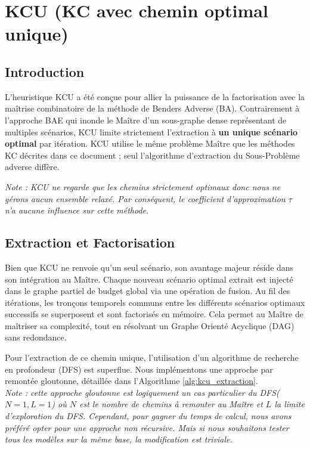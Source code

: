 \documentclass[11pt,a4paper]{article}
\begin{document}
\section{KCU (KC avec chemin optimal unique)}
\label{kcu}

\subsection{Introduction}

L'heuristique KCU a été conçue pour allier la puissance de la factorisation avec la maîtrise combinatoire de la méthode de Benders Adverse (BA). Contrairement à l'approche BAE qui inonde le Maître d'un sous-graphe dense représentant de multiples scénarios, KCU limite strictement l'extraction à \textbf{un unique scénario optimal} par itération. KCU utilise le même problème Maître que les méthodes KC décrites dans ce document ; seul l'algorithme d'extraction du Sous-Problème adverse diffère. 

\textit{Note : KCU ne regarde que les chemins strictement optimaux donc nous ne gérons aucun ensemble relaxé. Par conséquent, le coefficient d'approximation $\tau$ n'a aucune influence sur cette méthode.}

\subsection{Extraction et Factorisation}

Bien que KCU ne renvoie qu'un seul scénario, son avantage majeur réside dans son intégration au Maître. Chaque nouveau scénario optimal extrait est injecté dans le graphe partiel de budget global via une opération de fusion. Au fil des itérations, les tronçons temporels communs entre les différents scénarios optimaux successifs se superposent et sont factorisés en mémoire. Cela permet au Maître de maîtriser sa complexité, tout en résolvant un Graphe Orienté Acyclique (DAG) sans redondance.

Pour l'extraction de ce chemin unique, l'utilisation d'un algorithme de recherche en profondeur (DFS) est superflue. Nous implémentons une approche par remontée gloutonne, détaillée dans l'Algorithme \ref{alg:kcu_extraction}.\\
\textit{Note : cette approche gloutonne est logiquement un cas particulier du DFS($N=1, L=1$) où $N$ est le nombre de chemins à remonter au Maître et $L$ la limite d'exploration du DFS. Cependant, pour gagner du temps de calcul, nous avons préféré opter pour une approche non récursive. Mais si nous souhaitons tester tous les modèles sur la même base, la modification est triviale.}
\end{document}
